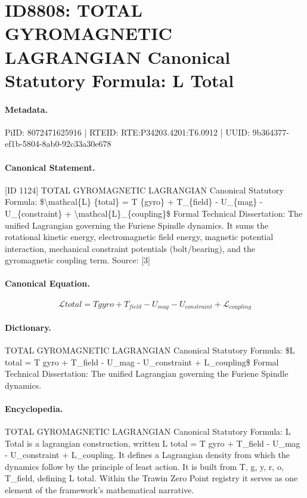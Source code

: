 \section*{ID8808: TOTAL GYROMAGNETIC LAGRANGIAN Canonical Statutory Formula: L Total}
\paragraph{Metadata.}
PiID: 8072471625916 | RTEID: RTE:P34203.4201:T6.0912 | UUID: 9b364377-ef1b-5804-8ab0-92c33a30e678

\paragraph{Canonical Statement.}
[ID 1124] TOTAL GYROMAGNETIC LAGRANGIAN Canonical Statutory Formula: \$\textbackslash{}mathcal\{L\} \{total\} = T \{gyro\} + T\_\{field\} - U\_\{mag\} - U\_\{constraint\} + \textbackslash{}mathcal\{L\}\_\{coupling\}\$ Formal Technical Dissertation: The unified Lagrangian governing the Furiene Spindle dynamics. It sums the rotational kinetic energy, electromagnetic field energy, magnetic potential interaction, mechanical constraint potentials (bolt/bearing), and the gyromagnetic coupling term. Source: [3]

\paragraph{Canonical Equation.}
\[
\mathcal{L} {total} = T {gyro} + T_{field} - U_{mag} - U_{constraint} + \mathcal{L}_{coupling}
\]

\paragraph{Dictionary.}
TOTAL GYROMAGNETIC LAGRANGIAN Canonical Statutory Formula: \$L total = T gyro + T\_field - U\_mag - U\_constraint + L\_coupling\$ Formal Technical Dissertation: The unified Lagrangian governing the Furiene Spindle dynamics.

\paragraph{Encyclopedia.}
TOTAL GYROMAGNETIC LAGRANGIAN Canonical Statutory Formula: L Total is a lagrangian construction, written L total = T gyro + T\_field - U\_mag - U\_constraint + L\_coupling. It defines a Lagrangian density from which the dynamics follow by the principle of least action. It is built from T, g, y, r, o, T\_field, defining L total. Within the Trawin Zero Point registry it serves as one element of the framework's mathematical narrative.
